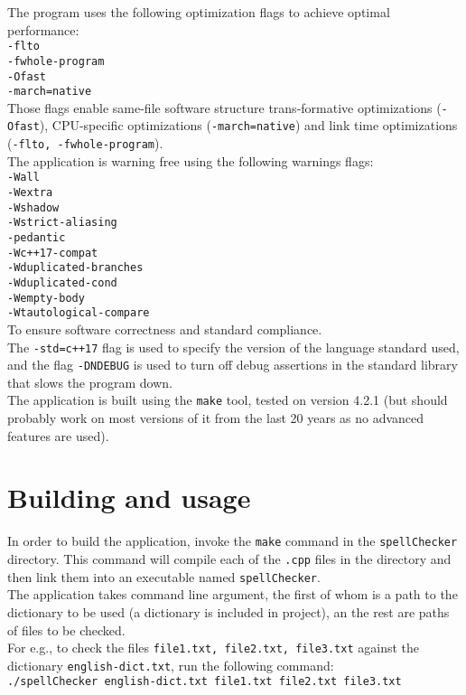 \documentclass[a4paper]{article}
\begin{document}
The program uses the following optimization flags to achieve optimal performance:\\
\texttt{-flto\\-fwhole-program\\-Ofast\\-march=native}\\
Those flags enable same-file software structure trans-formative optimizations (\texttt{-Ofast}), CPU-specific optimizations (\texttt{-march=native}) and link time optimizations (\texttt{-flto, -fwhole-program}).\\

The application is warning free using the following warnings flags:\\
\texttt{-Wall\\-Wextra\\-Wshadow\\-Wstrict-aliasing\\-pedantic\\-Wc++17-compat\\-Wduplicated-branches\\-Wduplicated-cond\\-Wempty-body\\-Wtautological-compare}\\
To ensure software correctness and standard compliance.\\

The \texttt{-std=c++17} flag is used to specify the version of the language standard used, and the flag \texttt{-DNDEBUG} is used to turn off debug assertions in the standard library that slows the program down.\\

The application is built using the \texttt{make} tool, tested on version 4.2.1 (but should probably work on most versions of it from the last 20 years as no advanced features are used).

\section{Building and usage}

In order to build the application, invoke the \texttt{make} command in the \texttt{spellChecker} directory. This command will compile each of the \texttt{.cpp} files in the directory and then link them into an executable named \texttt{spellChecker}.\\

The application takes command line argument, the first of whom is a path to the dictionary to be used (a dictionary is included in project), an the rest are paths of files to be checked.\\
For e.g., to check the files \texttt{file1.txt, file2.txt, file3.txt} against the dictionary \texttt{english-dict.txt}, run the following command:\\
\texttt{./spellChecker english-dict.txt file1.txt file2.txt file3.txt}\\
\end{document}
